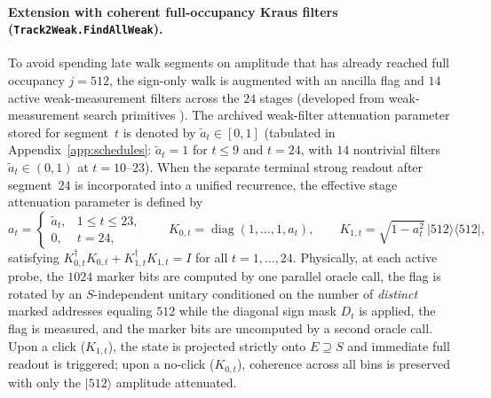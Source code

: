\documentclass[11pt,a4paper]{article}
\theoremstyle{definition}
\theoremstyle{remark}
\begin{document}
\paragraph{Extension with coherent full-occupancy Kraus filters (\texttt{Track2Weak.FindAllWeak}).}
To avoid spending late walk segments on amplitude that has already reached full occupancy \(j = 512\), the sign-only walk is augmented with an ancilla flag and \(14\) active weak-measurement filters across the \(24\) stages (developed from weak-measurement search primitives \cite{mizel2009,andres2022}). The archived weak-filter attenuation parameter stored for segment~\(t\) is denoted by \(\widetilde{a}_t \in [0, 1]\) (tabulated in Appendix~\ref{app:schedules}: \(\widetilde{a}_t = 1\) for \(t \le 9\) and \(t = 24\), with \(14\) nontrivial filters \(\widetilde{a}_t \in (0,1)\) at \(t = 10\text{--}23\)). When the separate terminal strong readout after segment~\(24\) is incorporated into a unified recurrence, the effective stage attenuation parameter is defined by
\[
  a_t =
  \begin{cases}
    \widetilde{a}_t, & 1 \le t \le 23, \\
    0, & t = 24,
  \end{cases}
  \qquad
  K_{0,t} = \operatorname{diag}(1,\dots,1,a_t), \qquad
  K_{1,t} = \sqrt{1 - a_t^2}\,|512\rangle\langle 512|,
\]
satisfying \(K_{0,t}^\dagger K_{0,t} + K_{1,t}^\dagger K_{1,t} = I\) for all \(t = 1, \dots, 24\). Physically, at each active probe, the \(1024\) marker bits are computed by one parallel oracle call, the flag is rotated by an \(S\)-independent unitary conditioned on the number of \emph{distinct} marked addresses equaling \(512\) while the diagonal sign mask \(D_t\) is applied, the flag is measured, and the marker bits are uncomputed by a second oracle call. Upon a click (\(K_{1,t}\)), the state is projected strictly onto \(E \supseteq S\) and immediate full readout is triggered; upon a no-click (\(K_{0,t}\)), coherence across all bins is preserved with only the \(|512\rangle\) amplitude attenuated.
\end{document}
